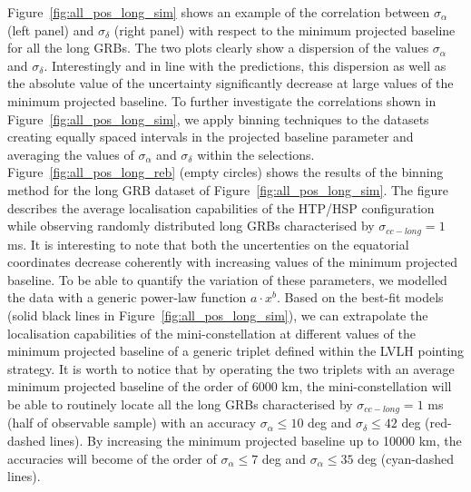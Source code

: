 \documentclass[]{spie}  %
\begin{document}
Figure~\ref{fig:all_pos_long_sim} shows an example of the correlation between $\sigma_\alpha$ (left panel) and $\sigma_\delta$ (right panel) with respect to the minimum projected baseline for all the long GRBs. The two plots clearly show a dispersion of the values $\sigma_\alpha$ and $\sigma_\delta$. Interestingly and in line with the predictions, this dispersion as well as the absolute value of the uncertainty significantly decrease at large values of the minimum projected baseline. To further investigate the correlations shown in Figure~\ref{fig:all_pos_long_sim}, we apply binning techniques to the datasets creating equally spaced intervals in the projected baseline parameter and averaging the values of $\sigma_\alpha$ and $\sigma_\delta$ within the selections. Figure~\ref{fig:all_pos_long_reb} (empty circles) shows the results of the binning method for the long GRB dataset of Figure~\ref{fig:all_pos_long_sim}. The figure describes the average localisation capabilities of the HTP/HSP configuration while observing randomly distributed long GRBs characterised by $\sigma_{cc-long} = 1$ ms. It is interesting to note that both the uncertenties on the equatorial coordinates decrease coherently with increasing values of the minimum projected baseline. To be able to quantify the variation of these parameters, we modelled the data with a generic power-law function $a\cdot x^b$. Based on the best-fit models (solid black lines in Figure~\ref{fig:all_pos_long_sim}), we can extrapolate the localisation capabilities of the mini-constellation at different values of the minimum projected baseline of a generic triplet defined within the LVLH pointing strategy. It is worth to notice that by operating the two triplets with an average minimum projected baseline of the order of 6000 km, the mini-constellation will be able to routinely locate all the long GRBs characterised by $\sigma_{cc-long} = 1$ ms (half of observable sample) with an accuracy $\sigma_\alpha \leq 10$ deg and $\sigma_\delta \leq 42$ deg (red-dashed lines). By increasing the minimum projected baseline up to 10000 km, the accuracies will become of the order of $\sigma_\alpha \leq 7$ deg and $\sigma_\alpha \leq 35$ deg (cyan-dashed lines). 
\end{document}
